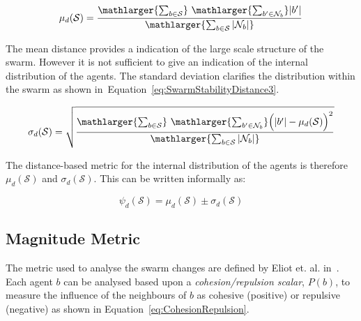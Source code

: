 \documentclass[preprint,12pt]{elsarticle}
\newcommand{\card}[1]{\vert{#1}\vert}
\newcommand{\magn}[1]{\vert{#1}\vert}
\begin{document}

\begin{equation}
\label{eq:SwarmStabilityDistance2}
\mu_d(\mathcal S) = \frac{\mathlarger{\sum_{b \in
\mathcal S}}~\mathlarger{\sum_{b' \in
\mathcal{N}_b}}\magn{b'}}{\mathlarger{\sum_{b \in
\mathcal S}\card{\mathcal{N}_b}}}
\end{equation}

The mean distance provides a indication of the large scale structure of the swarm. However it is not sufficient to give an indication of the internal distribution of the agents. The standard deviation clarifies the distribution within the swarm as shown in~Equation~\ref{eq:SwarmStabilityDistance3}. 


\begin{equation}
\label{eq:SwarmStabilityDistance3}
\sigma_d(\mathcal S) = \sqrt{\frac{\mathlarger{\sum_{b \in
\mathcal S}}~\mathlarger{\sum_{b' \in \mathcal{N}_b}}\Big(\magn{b'} -
\mu_d(\mathcal S)\Big)^2}{\mathlarger{\sum_{b \in
\mathcal S}\card{\mathcal{N}_b}}}}
\end{equation}

The distance-based metric for the internal distribution of the agents is therefore $\mu_d(\mathcal S)$ and $\sigma_d(\mathcal S)$. This can be written informally as:

\begin{equation}
\label{eq:SwarmDistanceMetric}
\psi_d(\mathcal S) = \mu_d(\mathcal S)\pm \sigma_d(\mathcal S)
\end{equation}

\subsection{Magnitude Metric}

The metric used to analyse the swarm changes are defined by Eliot et. al. in~\cite{EKB:18}. Each agent $b$ can be analysed based upon a \textit{cohesion/repulsion scalar}, $P(b)$, to measure the influence of the neighbours of $b$ as cohesive (positive) or repulsive (negative) as shown in Equation~\ref{eq:CohesionRepulsion}.
\end{document}
